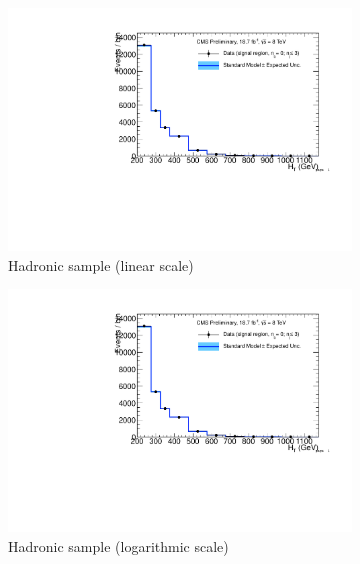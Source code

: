 \clearpage
\begin{figure}[h!]
  \centering
  \begin{subfigure}[b]{0.48\textwidth}
    \includegraphics[width=\textwidth,page=1]
    {Figs/results/v0/blueBand/bestFit_2012dev_RQcdZero_fZinvAll_0b_le3j-12hp_smOnly}
    \caption{Hadronic sample (linear scale)}
  \end{subfigure}
  \begin{subfigure}[b]{0.48\textwidth}
    \includegraphics[width=\textwidth,page=2]
    {Figs/results/v0/blueBand/bestFit_2012dev_RQcdZero_fZinvAll_0b_le3j-12hp_smOnly}
    \caption{Hadronic sample (logarithmic scale)}
  \end{subfigure}
  \begin{subfigure}[b]{0.48\textwidth}

\end{subfigure}
\end{figure}
